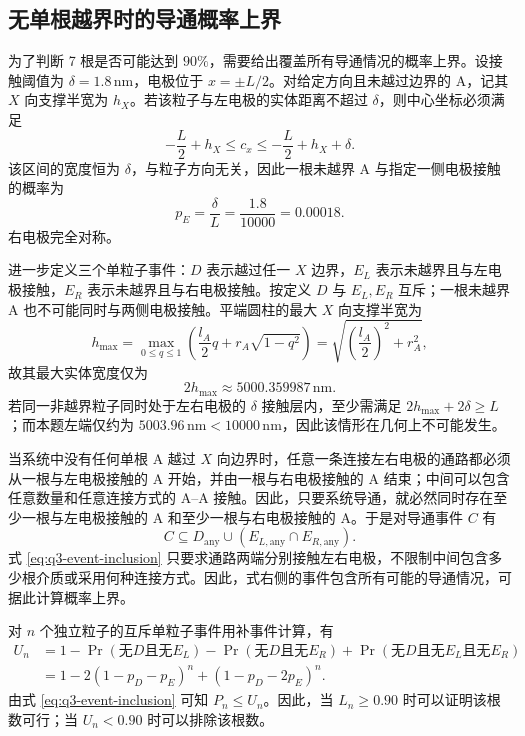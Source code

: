 \documentclass[withoutpreface,bwprint]{cumcmthesis}
\begin{document}
\subsection{无单根越界时的导通概率上界}

为了判断 7 根是否可能达到 $90\%$，需要给出覆盖所有导通情况的概率上界。设接触阈值为 $\delta=1.8\,\mathrm{nm}$，电极位于 $x=\pm L/2$。对给定方向且未越过边界的 A，记其 $X$ 向支撑半宽为 $h_X$。若该粒子与左电极的实体距离不超过 $\delta$，则中心坐标必须满足
\begin{equation}
 -\frac L2+h_X\le c_x\le -\frac L2+h_X+\delta.
 \label{eq:q3-left-anchor-interval}
\end{equation}
该区间的宽度恒为 $\delta$，与粒子方向无关，因此一根未越界 A 与指定一侧电极接触的概率为
\begin{equation}
 p_E=\frac{\delta}{L}=\frac{1.8}{10000}=0.00018.
 \label{eq:q3-pe}
\end{equation}
右电极完全对称。

进一步定义三个单粒子事件：$D$ 表示越过任一 $X$ 边界，$E_L$ 表示未越界且与左电极接触，$E_R$ 表示未越界且与右电极接触。按定义 $D$ 与 $E_L,E_R$ 互斥；一根未越界 A 也不可能同时与两侧电极接触。平端圆柱的最大 $X$ 向支撑半宽为
\begin{equation}
 h_{\max}=\max_{0\le q\le 1}\left(\frac{l_A}{2}q+r_A\sqrt{1-q^2}\right)
 =\sqrt{\left(\frac{l_A}{2}\right)^2+r_A^2},
 \label{eq:q3-hmax}
\end{equation}
故其最大实体宽度仅为
\[
2h_{\max}\approx 5000.359987\,\mathrm{nm}.
\]
若同一非越界粒子同时处于左右电极的 $\delta$ 接触层内，至少需满足 $2h_{\max}+2\delta\ge L$；而本题左端仅约为 $5003.96\,\mathrm{nm}<10000\,\mathrm{nm}$，因此该情形在几何上不可能发生。

当系统中没有任何单根 A 越过 $X$ 向边界时，任意一条连接左右电极的通路都必须从一根与左电极接触的 A 开始，并由一根与右电极接触的 A 结束；中间可以包含任意数量和任意连接方式的 A--A 接触。因此，只要系统导通，就必然同时存在至少一根与左电极接触的 A 和至少一根与右电极接触的 A。于是对导通事件 $C$ 有
\begin{equation}
 C\subseteq D_{\mathrm{any}}\cup\left(E_{L,\mathrm{any}}\cap E_{R,\mathrm{any}}\right).
 \label{eq:q3-event-inclusion}
\end{equation}
式 \eqref{eq:q3-event-inclusion} 只要求通路两端分别接触左右电极，不限制中间包含多少根介质或采用何种连接方式。因此，式右侧的事件包含所有可能的导通情况，可据此计算概率上界。

对 $n$ 个独立粒子的互斥单粒子事件用补事件计算，有
\begin{align}
 U_n
 &=1-\Pr(\text{无}D\text{且无}E_L)-\Pr(\text{无}D\text{且无}E_R)
   +\Pr(\text{无}D\text{且无}E_L\text{且无}E_R)\\
 &=1-2(1-p_D-p_E)^n+(1-p_D-2p_E)^n.
 \label{eq:q3-upper}
\end{align}
由式 \eqref{eq:q3-event-inclusion} 可知 $P_n\le U_n$。因此，当 $L_n\ge0.90$ 时可以证明该根数可行；当 $U_n<0.90$ 时可以排除该根数。
\end{document}
